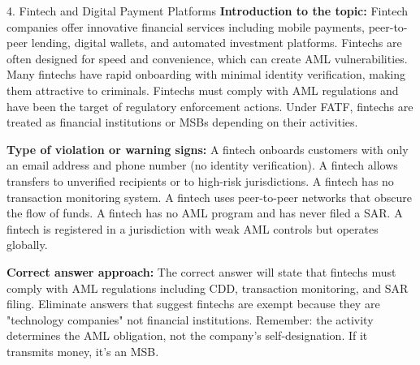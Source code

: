 \documentclass[11pt,a4paper]{beamer}
\begin{document}
\begin{frame}{4. Fintech and Digital Payment Platforms}
\tiny
\noindent\textbf{Introduction to the topic:} Fintech companies offer innovative financial services including mobile payments, peer-to-peer lending, digital wallets, and automated investment platforms. Fintechs are often designed for speed and convenience, which can create AML vulnerabilities. Many fintechs have rapid onboarding with minimal identity verification, making them attractive to criminals. Fintechs must comply with AML regulations and have been the target of regulatory enforcement actions. Under FATF, fintechs are treated as financial institutions or MSBs depending on their activities.

\vspace{0.1cm}
\noindent\textbf{Type of violation or warning signs:} A fintech onboards customers with only an email address and phone number (no identity verification). A fintech allows transfers to unverified recipients or to high-risk jurisdictions. A fintech has no transaction monitoring system. A fintech uses peer-to-peer networks that obscure the flow of funds. A fintech has no AML program and has never filed a SAR. A fintech is registered in a jurisdiction with weak AML controls but operates globally.

\vspace{0.1cm}
\noindent\textbf{Correct answer approach:} The correct answer will state that fintechs must comply with AML regulations including CDD, transaction monitoring, and SAR filing. Eliminate answers that suggest fintechs are exempt because they are "technology companies" not financial institutions. Remember: the activity determines the AML obligation, not the company's self-designation. If it transmits money, it's an MSB.
\end{frame}
\end{document}

